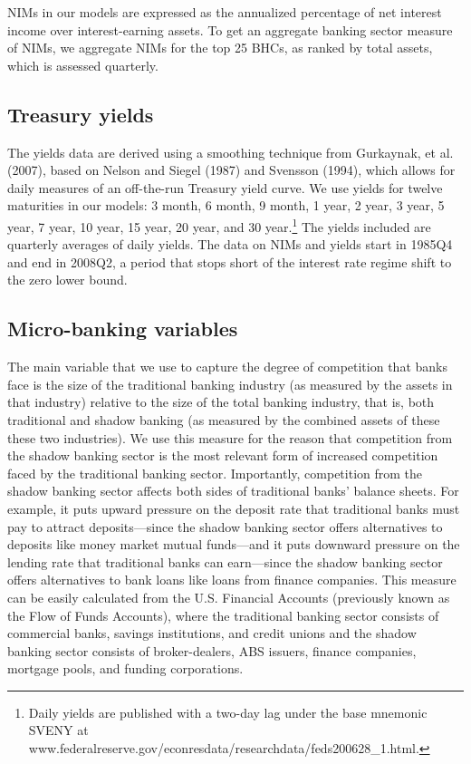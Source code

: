 \documentclass[11pt]{article}
\renewcommand{\baselinestretch}{1.5}
\begin{document}
\begin{frame}
NIMs in our models are expressed as the annualized percentage of net interest income over interest-earning assets. To get an aggregate banking sector measure of NIMs, we aggregate NIMs for the top 25 BHCs, as ranked by total assets, which is assessed quarterly.

\subsection{Treasury yields}

The yields data are derived using a smoothing technique from Gurkaynak, et al. (2007), based on Nelson and Siegel (1987) and Svensson (1994), which allows for daily measures of an off-the-run Treasury yield curve. We use yields for twelve maturities in our models: 3 month, 6 month, 9 month, 1 year, 2 year, 3 year, 5 year, 7 year, 10 year, 15 year, 20 year, and 30 year.\renewcommand{\baselinestretch}{1}\footnote{Daily yields are published with a two-day lag under the base mnemonic SVENY at  www.federalreserve.gov/econresdata/researchdata/feds200628\_1.html.\vspace{0.05in}}\renewcommand{\baselinestretch}{1.5} The yields included are quarterly averages of daily yields.  The data on NIMs and yields start in 1985Q4 and end in 2008Q2, a period that stops short of the interest rate regime shift to the zero lower bound.

\subsection{Micro-banking variables}

\vspace{-0.1in} The main variable that we use to capture the degree of competition that banks face is the size of the traditional
banking industry (as measured by the assets in that industry) relative to the size of the total banking industry, that is, both
traditional and shadow banking (as measured by the combined assets of these these two industries). We use this measure for the
reason that competition from the shadow banking sector is the most relevant form of increased competition faced by the
traditional banking sector.  Importantly, competition from the shadow banking sector affects both sides of traditional banks'
balance sheets. For example, it puts upward pressure on the deposit rate that traditional banks must pay to attract deposits---since the shadow banking sector offers alternatives to deposits like money market mutual funds---and it puts downward pressure on the lending rate that traditional banks can earn---since the shadow banking sector offers alternatives to bank loans like loans from finance companies. This measure can be easily calculated from the U.S. Financial Accounts (previously known as the Flow of Funds Accounts), where the traditional banking sector consists of commercial banks, savings institutions, and credit unions and the shadow banking sector consists of broker-dealers, ABS issuers, finance companies, mortgage pools, and funding corporations.


\end{frame}
\end{document}
